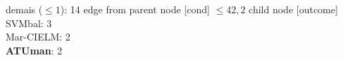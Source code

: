 {{{{{%
demais ($\leq 1$): 14} edge from parent node [cond] {$\leq42,2$}}
child {node [outcome] {
SVMbal: 3\\
Mar-CIELM: 2\\
\textbf{ATUman}: 2\\
}}}}}
